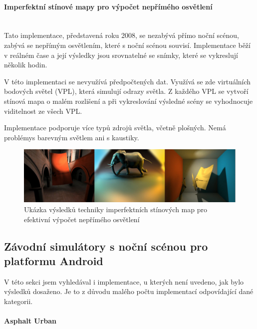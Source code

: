 \documentclass[11pt,twoside,a4paper]{book}
\begin{document}
\paragraph{Imperfektní stínové mapy pro výpočet nepřímého osvětlení}\mbox{}\\

Tato implementace, představená roku 2008, se nezabývá přímo noční scénou, zabývá se nepřímým osvětlením, které s noční scénou souvisí. Implementace běží v reálném čase a její výsledky jsou srovnatelné se snímky, které se vykreslují několik hodin.

V této implementaci se nevyužívá předpočtených dat. Využívá se zde virtuálních bodových světel (VPL), která simulují odrazy světla. Z každého VPL se vytvoří stínová mapa o malém rozlišení a při vykreslování výsledné scény se vyhodnocuje viditelnost ze všech VPL.

Implementace podporuje více typů zdrojů světla, včetně plošných. Nemá problémy\linebreak s barevným světlem ani s kaustiky.

\begin{figure}[h!]
\begin{center}
\includegraphics[width=150mm]{figures/ISM.png}
\caption{Ukázka výsledků techniky imperfektních stínových map pro efektivní výpočet nepřímého osvětlení \cite{Ritschel:2008:ISM}}
\end{center}
\end{figure}

\subsection{Závodní simulátory s noční scénou pro platformu Android}
V této sekci jsem vyhledával i implementace, u kterých není uvedeno, jak bylo výsledků dosaženo. Je to z důvodu malého počtu implementací odpovídající dané kategorii.

\paragraph{Asphalt Urban}\mbox{}\\
\end{document}
